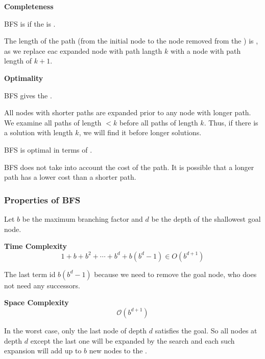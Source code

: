 \begin{listu}
    \item \textbf{Completeness}
    
    \begin{listu}
        \item BFS is  if the  is .
        \item The length of the path (from the initial node to the node removed from the \Frontier) is , as we replace eac expanded node with path langth $k$ with a node with path length of $k + 1$. 
    \end{listu}

    \item \textbf{Optimality}
    
    \begin{listu}
        \item BFS gives the . 

        All nodes with shorter paths are expanded prior to any node with longer path. We examine all paths of length $< k$ before all paths of length $k$. Thus, if there is a solution with length $k$, we will find it before longer solutions. 

        \item BFS is  optimal in terms of .
        
        BFS does not take into account the cost of the path. It is possible that a longer path has a lower cost than a shorter path.
    \end{listu}
\end{listu}


\subsubsection{Properties of BFS}

Let $b$ be the maximum branching factor and $d$ be the depth of the shallowest goal node.

\begin{listu}
    \item \textbf{Time Complexity} \[
        1 + b + b^2 + \cdots + b^d + b(b^d - 1) \in O(b^{d+1})
    \]

    The last term id $b(b^d - 1)$ because we need to remove the goal node, who does not need any successors.

    \item \textbf{Space Complexity} \[
        \mathcal{O}(b^{d+1})
    \]
    
    In the worst case, only the last node of depth $d$ satisfies the goal. So all nodes at depth $d$ except the last one will be expanded by the search and each such expansion will add up to $b$ new nodes to the \Frontier.
\end{listu}

